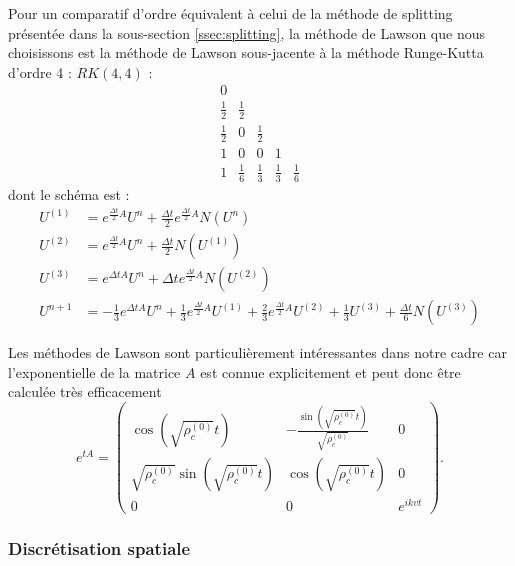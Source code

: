Pour un comparatif d'ordre équivalent à celui de la méthode de splitting présentée dans la sous-section \ref{ssec:splitting}, la méthode de Lawson que nous choisissons est la méthode de Lawson sous-jacente à la méthode Runge-Kutta d'ordre 4 : $RK(4,4)$ :
$$
  \begin{array}{c|cccc}
    0           & \\
    \frac{1}{2} & \frac{1}{2} \\
    \frac{1}{2} & 0           & \frac{1}{2} \\
    1           & 0           & 0           & 1           \\
  \hline
    1           & \frac{1}{6} & \frac{1}{3} & \frac{1}{3} & \frac{1}{6}
  \end{array}
$$
dont le schéma est :
$$
  \begin{aligned}
    U^{(1)} &= e^{\frac{\Delta t}{2}A}U^n + \frac{\Delta t}{2}e^{\frac{\Delta t}{2}A} N(U^n)\\
    U^{(2)} &= e^{\frac{\Delta t}{2}A}U^n + \frac{\Delta t}{2}N(U^{(1)}) \\
    U^{(3)} &= e^{\Delta t A}U^n + \Delta t e^{\frac{\Delta t}{2}A}N(U^{(2)}) \\
    U^{n+1} &= -\frac{1}{3}e^{\Delta tA}U^n + \frac{1}{3}e^{\frac{\Delta t}{2}A}U^{(1)} + \frac{2}{3}e^{\frac{\Delta t}{2}A}U^{(2)} + \frac{1}{3}U^{(3)} + \frac{\Delta t}{6}N(U^{(3)})
  \end{aligned}
$$

Les méthodes de Lawson sont particulièrement intéressantes dans notre cadre car l'exponentielle de la matrice $A$ est connue explicitement et peut donc être calculée très efficacement 
$$
  e^{tA} = \begin{pmatrix}
    \cos\left(\sqrt{\rho_c^{(0)}}t\right)                    & -\frac{\sin\left(\sqrt{\rho_c^{(0)}}t\right)}{\sqrt{\rho_c^{(0)}}} & 0 \\
    \sqrt{\rho_c^{(0)}}\sin\left(\sqrt{\rho_c^{(0)}}t\right) & \cos\left(\sqrt{\rho_c^{(0)}}t\right)                              & 0 \\
    0                                                        & 0                                                                  & e^{ikvt}
  \end{pmatrix}. 
$$

\subsubsection{Discrétisation spatiale}

